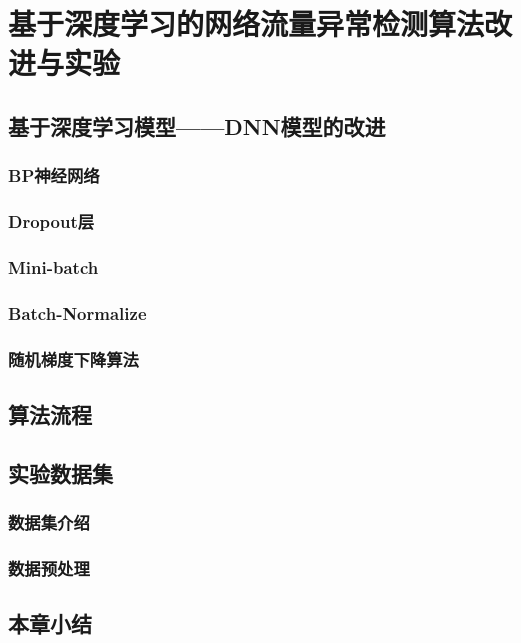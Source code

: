
\chapter{基于深度学习的网络流量异常检测算法改进与实验}

\section{基于深度学习模型——DNN模型的改进}\label{txt:FreqCmd}

\subsection{BP神经网络}

\subsection{Dropout层}

\subsection{Mini-batch}

\subsection{Batch-Normalize}

\subsection{随机梯度下降算法}

\section{算法流程}

\section{实验数据集}

\subsection{数据集介绍}

\subsection{数据预处理}

\section{本章小结}
